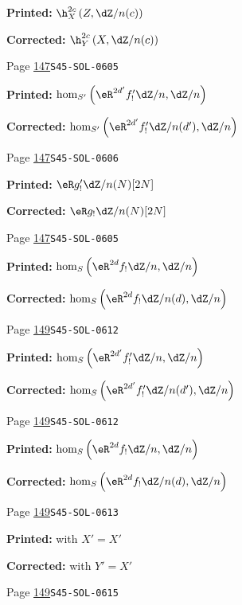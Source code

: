 \begin{description}
\par\noindent\textbf{Printed:} \(\h_X^{2 c}\left(Z,\dZ/n(c)\right)\)
\par\noindent\textbf{Corrected:} \(\h_Y^{2 c}\left(X,\dZ/n(c)\right)\)
\smallskip
\item[\hypertarget{apparatus:EN-0077}{77}] Page \hyperlink{printpage:en:147}{147}\quad\texttt{S45-SOL-0605}
\par\noindent\textbf{Printed:} \(\hom_{S'}\left(\eR^{2 d'} f_!' \dZ/n,\dZ/n\right)\)
\par\noindent\textbf{Corrected:} \(\hom_{S'}\left(\eR^{2 d'} f_!' \dZ/n(d'),\dZ/n\right)\)
\smallskip
\item[\hypertarget{apparatus:EN-0078}{78}] Page \hyperlink{printpage:en:147}{147}\quad\texttt{S45-SOL-0606}
\par\noindent\textbf{Printed:} \(\eR g_!'\dZ/n(N)[2 N]\)
\par\noindent\textbf{Corrected:} \(\eR g_!\dZ/n(N)[2 N]\)
\smallskip
\item[\hypertarget{apparatus:EN-0079}{79}] Page \hyperlink{printpage:en:147}{147}\quad\texttt{S45-SOL-0605}
\par\noindent\textbf{Printed:} \(\hom_S\left(\eR^{2 d} f_!\dZ/n,\dZ/n\right)\)
\par\noindent\textbf{Corrected:} \(\hom_S\left(\eR^{2 d} f_!\dZ/n(d),\dZ/n\right)\)
\smallskip
\item[\hypertarget{apparatus:EN-0080}{80}] Page \hyperlink{printpage:en:149}{149}\quad\texttt{S45-SOL-0612}
\par\noindent\textbf{Printed:} \(\hom_S\left(\eR^{2 d'} f_!' \dZ/n,\dZ/n\right)\)
\par\noindent\textbf{Corrected:} \(\hom_S\left(\eR^{2 d'} f_!' \dZ/n(d'),\dZ/n\right)\)
\smallskip
\item[\hypertarget{apparatus:EN-0081}{81}] Page \hyperlink{printpage:en:149}{149}\quad\texttt{S45-SOL-0612}
\par\noindent\textbf{Printed:} \(\hom_S\left(\eR^{2 d}f_!\dZ/n,\dZ/n\right)\)
\par\noindent\textbf{Corrected:} \(\hom_S\left(\eR^{2 d}f_!\dZ/n(d),\dZ/n\right)\)
\smallskip
\item[\hypertarget{apparatus:EN-0082}{82}] Page \hyperlink{printpage:en:149}{149}\quad\texttt{S45-SOL-0613}
\par\noindent\textbf{Printed:} with $X'=X'$
\par\noindent\textbf{Corrected:} with $Y'=X'$
\smallskip
\item[\hypertarget{apparatus:EN-0083}{83}] Page \hyperlink{printpage:en:149}{149}\quad\texttt{S45-SOL-0615}

\end{description}
